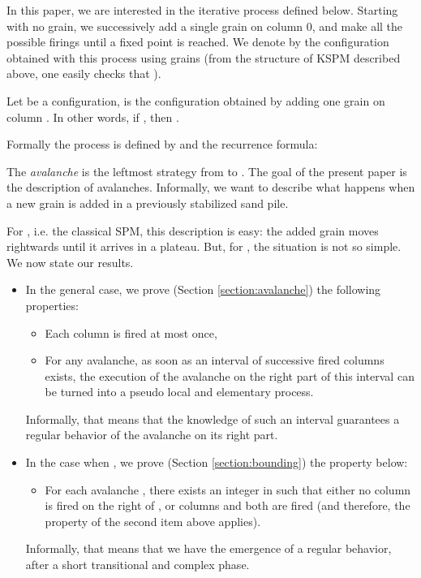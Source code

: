 \documentclass[11pt,a4paper]{llncs}
\begin{document}
In this paper, we are interested in the iterative process defined below. Starting with no grain, we successively add a single  grain on  column 0, and make all the possible firings until  a fixed point is reached. We denote by  the configuration obtained with this process using  grains (from the structure of KSPM described above, one easily checks that ).  


Let  be a configuration,  is the configuration obtained by adding one grain on column . In other words, if , then . 

Formally the process is defined by  and the recurrence formula: 



The {\em  avalanche}  is  the leftmost strategy from  to . 
The goal of the present paper is the description of avalanches. Informally, we want to describe what happens when a new grain is added in a previously stabilized sand pile.  


For , i.e.  the classical SPM, this description is easy: the added grain moves rightwards until it arrives in a plateau. But, for ,  the situation is not so simple. We now state our results. 

 \begin{itemize}
\item In the general case, we prove (Section \ref{section:avalanche}) the following properties:  
 \begin{itemize}
\item Each column is fired at most once, 
\item For any avalanche, as soon as an interval   of successive fired columns exists, the execution of the avalanche on the right part of this interval can be turned into a pseudo local  and elementary process. 

\end{itemize}
Informally, that means that the knowledge of such an interval guarantees a regular behavior  of the avalanche on its right part. 

\item  In the case when ,  we prove (Section \ref{section:bounding}) the property below: 
\begin{itemize}
\item For each avalanche , there  exists an integer   in  such that either no column is fired on the right of ,  or  columns  and  both are fired (and therefore, the property of the second item above applies). 
\end{itemize}
Informally, that means that we have the emergence of  a regular behavior, after a short transitional and complex phase. 
\end{itemize}
\end{document}
